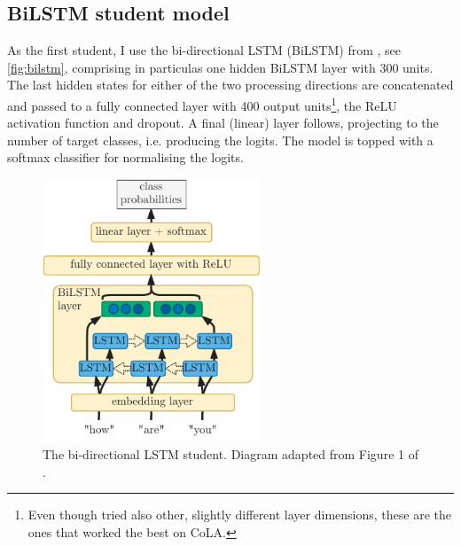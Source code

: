 \documentclass[bsc,frontabs,twoside,singlespacing,parskip,deptreport]{infthesis}
\begin{document}
{{    \subsection{BiLSTM student model}{
      \label{sec:student-bilstm}
      As the first student, I use the bi-directional LSTM (BiLSTM) from \citeauthor{Tang_2019b}, see \autoref{fig:bilstm}, comprising in particulas one hidden BiLSTM layer with 300 units. The last hidden states for either of the two processing directions are concatenated and passed to a fully connected layer with 400 output units\footnote{Even though \citeauthor{Tang_2019b} tried also other, slightly different layer dimensions, these are the ones that worked the best on CoLA.}, the ReLU activation function and dropout. A final (linear) layer follows, projecting to the number of target classes, i.e. producing the logits. The model is topped with a softmax classifier for normalising the logits.
      \begin{figure}[h!t]
        \centering
        \includegraphics[width=6.5cm]{graphics/bilstm}
        \caption{The bi-directional LSTM student. Diagram adapted from Figure 1 of \citet{Tang_2019a}.}
        \label{fig:bilstm}
      \end{figure}

}}}
\end{document}
